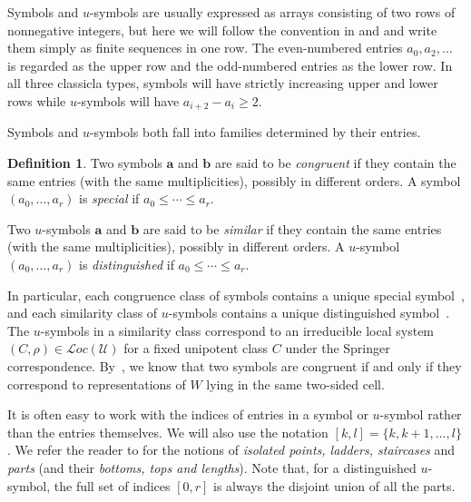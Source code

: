 \documentclass{amsart}
\theoremstyle{definition}
\newtheorem{definition}[theorem]{Definition}
\newcommand{\cL}{\mathcal{L}}
\newcommand{\cU}{\mathcal{U}}
\newcommand{\ba}{\mathbf{a}}
\newcommand{\bb}{\mathbf{b}}
\newcommand{\0}{\mathcal{O}}
\begin{document}
Symbols and $u$-symbols are usually expressed as arrays consisting
of two rows of nonnegative integers, but here we will follow the convention in \cite{Lusztig:unipotent} and \cite{Achar-Sage-special} and write them
simply as finite sequences in one row. The even-numbered entries $a_0, a_2, \ldots$ is regarded as the upper row and the odd-numbered
entries as the lower row. In all three classicla types, symbols will have
strictly increasing upper and lower rows while $u$-symbols will have
$a_{i+2}-a_i\ge 2$.


Symbols and $u$-symbols both fall into families determined by their
entries. 

\begin{definition}
	Two symbols $\ba$ and $\bb$ are said to be \emph{congruent} if they contain
	the same entries (with the same multiplicities), possibly in different
	orders.  A symbol $(a_0, \ldots, a_r)$ is \emph{special} if $a_0 \le \cdots
	\le a_r$. 
	
	Two $u$-symbols $\ba$ and $\bb$ are said to be \emph{similar} if they
	contain the same entries (with the same multiplicities), possibly in
	different orders.  A $u$-symbol $(a_0, \ldots, a_r)$ is
	\emph{distinguished} if $a_0 \le \cdots \le a_r$. 
\end{definition}

In particular, each congruence class of symbols contains a unique special
symbol~\cite[Lemmas~1.6, 2.6, 3.6]{Lusztig:unipotent}, and each similarity class of
$u$-symbols contains a unique distinguished symbol~\cite[\S 11.5]{Lusztig:icc}.  The $u$-symbols in a similarity class correspond to an irreducible local system $(C, \rho) \in \cL oc(\cU)$ for a fixed unipotent class $C$ under the Springer correspondence. By~\cite{Lusztig:special}, we know that two symbols are congruent if and only if they correspond to representations of $W$ lying in the same two-sided cell. 

It is often easy to work with the indices of entries in a symbol or
$u$-symbol rather than the entries themselves. We will also use the notation $[k,l] = \{k, k+1, \ldots, l\}$. We refer the reader to \cite[Defintion 3.4]{Achar-Sage-special} for the notions of {\it isolated points, ladders, staircases} and {\it parts} (and their {\it bottoms, tops and lengths}).
Note that, for a distinguished $u$-symbol, the full set of indices $[0,r]$ is always the disjoint union of all the parts.
\end{document}
